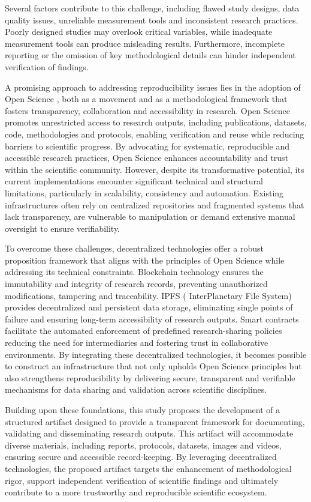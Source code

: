 \documentclass{article}
\begin{document}
Several factors contribute to this challenge, including flawed study designs, data quality issues, unreliable measurement tools and inconsistent research practices. Poorly designed studies may overlook critical variables, while inadequate measurement tools can produce misleading results. Furthermore, incomplete reporting or the omission of key methodological details can hinder independent verification of findings.

A promising approach to addressing reproducibility issues lies in the adoption of Open Science \cite{foster_open_2017}, both as a movement and as a methodological framework that fosters transparency, collaboration and accessibility in research. Open Science promotes unrestricted access to research outputs, including publications, datasets, code, methodologies and protocols, enabling verification and reuse while reducing barriers to scientific progress. By advocating for systematic, reproducible and accessible research practices, Open Science enhances accountability and trust within the scientific community. However, despite its transformative potential, its current implementations encounter significant technical and structural limitations, particularly in scalability, consistency and automation. Existing infrastructures often rely on centralized repositories and fragmented systems that lack transparency, are vulnerable to manipulation or demand extensive manual oversight to ensure verifiability.

To overcome these challenges, decentralized technologies offer a robust proposition framework that aligns with the principles of Open Science while addressing its technical constraints. Blockchain technology ensures the immutability and integrity of research records, preventing unauthorized modifications, tampering and traceability. IPFS ( InterPlanetary File System) provides decentralized and persistent data storage, eliminating single points of failure and ensuring long-term accessibility of research outputs. Smart contracts facilitate the automated enforcement of predefined research-sharing policies reducing the need for intermediaries and fostering trust in collaborative environments. By integrating these decentralized technologies, it becomes possible to construct an infrastructure that not only upholds Open Science principles but also strengthens reproducibility by delivering secure, transparent and verifiable mechanisms for data sharing and validation across scientific disciplines.

Building upon these foundations, this study proposes the development of a structured artifact designed to provide a transparent framework for documenting, validating and disseminating research outputs. This artifact will accommodate diverse materials, including reports, protocols, datasets, images and videos, ensuring secure and accessible record-keeping. By leveraging decentralized technologies, the proposed artifact targets the enhancement of methodological rigor, support independent verification of scientific findings and ultimately contribute to a more trustworthy and reproducible scientific ecosystem.
\end{document}
